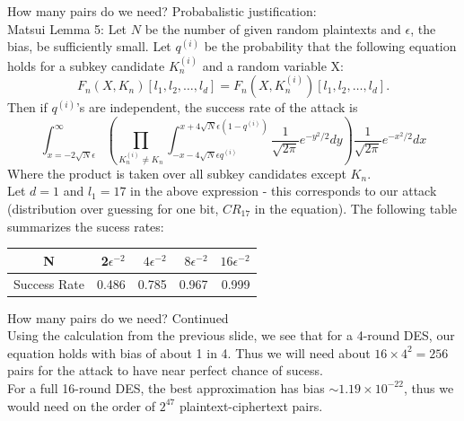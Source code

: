 \documentclass[9pt]{beamer}
\begin{document}
\begin{frame}
How many pairs do we need? Probabalistic justification:\\
\vspace{3mm}
Matsui Lemma 5: Let $N$ be the number of given random plaintexts and $\epsilon$, the bias, be sufficiently small. Let $q^{(i)}$ be the probability that the following equation holds for a subkey candidate $K_n^{(i)}$ and a random variable X:
\[ F_n(X,K_n)[l_1, l_2,\dots,l_d] = F_n(X, K_n^{(i)})[l_1, l_2, \dots, l_d].\]
Then if $q^{(i)}$'s are independent, the success rate of the attack is
\[ \int_{x=-2\sqrt{N}\epsilon}^\infty \left( \prod_{K_n^{(i)} \neq K_n} \int_{-x-4\sqrt{N}\epsilon q^{(i)}}^{x+4\sqrt{N}\epsilon (1 - q^{(i)})} \frac{1}{\sqrt{2\pi}} e^{-y^2/2} dy \right) \frac{1}{\sqrt{2\pi}} e^{-x^2/2} dx \]
Where the product is taken over all subkey candidates except $K_n$.\\
\vspace{3mm}
Let $d = 1$ and $l_1 = 17$ in the above expression - this corresponds to our attack (distribution over guessing for one bit, $CR_{17}$ in the equation). The following table summarizes the sucess rates:
\begin{center}
\begin{tabular}{|c|r|r|r|r|}
\hline
N & 2$\epsilon^{-2}$ & $4\epsilon^{-2}$ & $8\epsilon^{-2}$ & $16\epsilon^{-2}$ \\
\hline
Success Rate & 0.486 & 0.785 & 0.967 & 0.999 \\
\hline
\end{tabular} 
\end{center}
\end{frame}

\begin{frame}
How many pairs do we need? Continued\\
\vspace{3mm}
Using the calculation from the previous slide, we see that for a 4-round DES, our equation holds with bias of about 1 in 4. Thus we will need about $16\times 4^2 = 256$ pairs for the attack to have near perfect chance of sucess.\\
\vspace{3mm}
For a full 16-round DES, the best approximation has bias $\sim 1.19\times 10^{-22}$, thus we would need on the order of $2^{47}$ plaintext-ciphertext pairs.
\end{frame}
\end{document}
